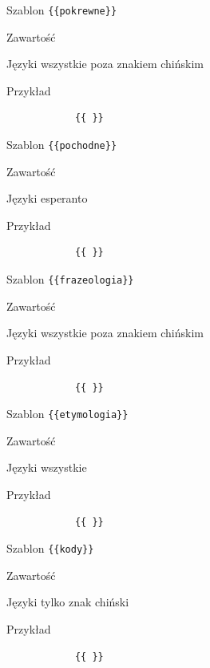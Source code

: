 \documentclass{pracamgr}
\newcommand{\spacer}{
	\begin{center}
		\textasteriskcentered
	\end{center}
}
\newenvironment{description-sub}[0]{
	\begin{basedescript}{\desclabelstyle{\pushlabel}\desclabelwidth{6em}}\setlength{\itemsep}{-2mm}
}{
	\end{basedescript}
}
\begin{document}
\spacer
\begin{description-sub}
	\item[Szablon] \verb|{{pokrewne}}|
	\item[Zawartość]
	\item[Języki] wszystkie poza znakiem chińskim
	\item[Przykład]
		\begin{verbatim}
			{{ }}
		\end{verbatim}
\end{description-sub}
\spacer
\begin{description-sub}
	\item[Szablon] \verb|{{pochodne}}|
	\item[Zawartość]
	\item[Języki] esperanto
	\item[Przykład]
		\begin{verbatim}
			{{ }}
		\end{verbatim}
\end{description-sub}
\spacer
\begin{description-sub}
	\item[Szablon] \verb|{{frazeologia}}|
	\item[Zawartość]
	\item[Języki] wszystkie poza znakiem chińskim
	\item[Przykład]
		\begin{verbatim}
			{{ }}
		\end{verbatim}
\end{description-sub}
\spacer
\begin{description-sub}
	\item[Szablon] \verb|{{etymologia}}|
	\item[Zawartość]
	\item[Języki] wszystkie
	\item[Przykład]
		\begin{verbatim}
			{{ }}
		\end{verbatim}
\end{description-sub}
\spacer
\begin{description-sub}
	\item[Szablon] \verb|{{kody}}|
	\item[Zawartość]
	\item[Języki] tylko znak chiński
	\item[Przykład]
		\begin{verbatim}
			{{ }}
		\end{verbatim}
\end{description-sub}
\end{document}
